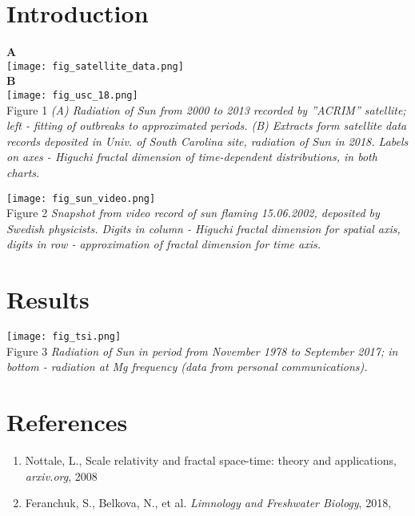 \documentclass[a4paper]{article}
\begin{document}
\begin{center}
{\Large{}}
\vskip 5pt
\end{center}

\section*{Introduction}

{\large{\textbf{A}}}\\
\texttt{[image: fig\_satellite\_data.png]}\\
{\large{\textbf{B}}}\\
\texttt{[image: fig\_usc\_18.png]}\\
Figure 1 \textit{(A) Radiation of Sun from 2000 to 2013 recorded by ''ACRIM'' satellite; left - fitting of outbreaks to approximated periods. (B) Extracts form satellite data records deposited in Univ. of South Carolina site, radiation of Sun in 2018. Labels on axes - Higuchi fractal dimension of time-dependent distributions, in both charts.}

\texttt{[image: fig\_sun\_video.png]}\\
Figure 2 \textit{Snapshot from video record of sun flaming 15.06.2002, deposited by Swedish physicists. Digits in column - Higuchi fractal dimension for spatial axis, digits in row - approximation of fractal dimension for time axis. }

\section*{Results}

\texttt{[image: fig\_tsi.png]}\\
Figure 3 \textit{Radiation of Sun in period from November 1978 to September 2017; in bottom - radiation at Mg frequency (data from personal communications). }

\section*{References}

\begin{enumerate}

\item Nottale, L., Scale relativity and fractal space-time: theory and applications, \textit{arxiv.org}, 2008

\item Feranchuk, S., Belkova, N., et al. \textit{Limnology and Freshwater Biology}, 2018,

\end{enumerate}
\end{document}
